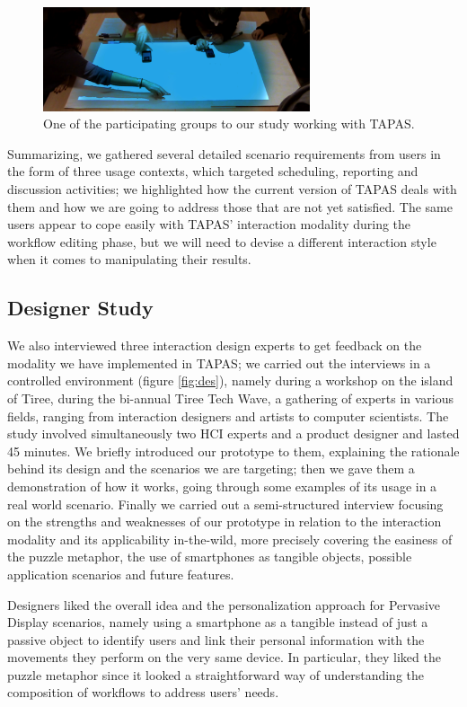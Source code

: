 \begin{figure}[ht!]
\centering
\includegraphics[width=0.7\textwidth]{images/c4/studs.png}
\caption{One of the participating groups to our study working with \ac{TAPAS}.}\label{fig:studs}
\end{figure}

Summarizing, we gathered several detailed scenario requirements from users in the form of three usage contexts, which targeted scheduling, reporting and discussion activities; we highlighted how the current version of \acs{TAPAS} deals with them and how we are going to address those that are not yet satisfied. The same users appear to cope easily with \ac{TAPAS}' interaction modality during the workflow editing phase, but we will need to devise a different interaction style when it comes to manipulating their results.

\subsection{Designer Study}
We also interviewed three interaction design experts to get feedback on the modality we have implemented in \acs{TAPAS}; we carried out the interviews in a controlled environment (figure \ref{fig:des}), namely during a workshop on the island of Tiree, during the bi-annual Tiree Tech Wave, a gathering of experts in various fields, ranging from interaction designers and artists to computer scientists. The study involved simultaneously two HCI experts and a product designer and lasted 45 minutes. We briefly introduced our prototype to them, explaining the rationale behind its design and the scenarios we are targeting; then we gave them a demonstration of how it works, going through some examples of its usage in a real world scenario. Finally we carried out a semi-structured interview focusing on the strengths and weaknesses of our prototype in relation to the interaction modality and its applicability in-the-wild, more precisely covering the easiness of the puzzle metaphor, the use of smartphones as tangible objects, possible application scenarios and future features.

Designers liked the overall idea and the personalization approach for Pervasive Display scenarios, namely using a smartphone as a tangible instead of just a passive object to identify users and link their personal information with the movements they perform on the very same device. In particular, they liked the puzzle metaphor since it looked a straightforward way of understanding the composition of workflows to address users' needs.


